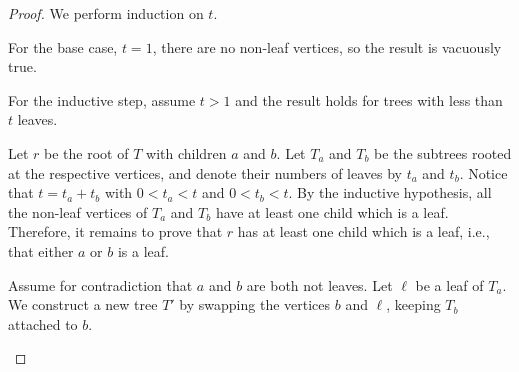 \documentclass[12pt]{article}
\theoremstyle{definition}
\newcommand{\<}{\langle}
\renewcommand{\>}{\rangle}
\begin{document}
\begin{proof}
    We perform induction on $t$.

    For the base case, $t = 1$, there are no non-leaf vertices, so the result is vacuously true.

    For the inductive step, assume $t > 1$ and the result holds for trees with less than $t$ leaves.
    
    Let $r$ be the root of $T$ with children $a$ and $b$.
    Let $T_a$ and $T_b$ be the subtrees rooted at the respective vertices, and denote their numbers of leaves by $t_a$ and $t_b$.
    Notice that $t = t_a + t_b$ with $0 < t_a < t$ and $0 < t_b < t$.
    By the inductive hypothesis, all the non-leaf vertices of $T_a$ and $T_b$ have at least one child which is a leaf.
    Therefore, it remains to prove that $r$ has at least one child which is a leaf, i.e., that either $a$ or $b$ is a leaf.
    


    Assume for contradiction that $a$ and $b$ are both not leaves.
    Let $\ell$ be a leaf of $T_a$.
    We construct a new tree $T'$ by swapping the vertices $b$ and $\ell$, keeping $T_b$ attached to $b$.
    \begin{center}
\end{center}
\end{proof}
\end{document}
